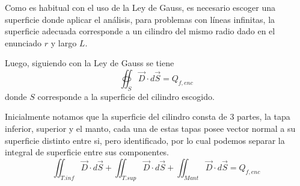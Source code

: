 \documentclass[11pt]{article}
\begin{document}
\begin{solucion}
    Como es habitual con el uso de la Ley de Gauss, es necesario escoger una superficie donde aplicar el análisis, para problemas con líneas infinitas, la superficie adecuada corresponde a un cilindro del mismo radio dado en el enunciado $r$ y largo \textbf{} $L$.

    \begin{figure}[H]
        \centering
    \end{figure}

    Luego, siguiendo con la Ley de Gauss se tiene
    \begin{equation}
        \oiint_S \vec{D} \cdot d\vec{S} = Q_{f, enc}
    \end{equation}
    donde $S$ corresponde a la superficie del cilindro escogido.

    Inicialmente notamos que la superficie del cilindro consta de 3 partes, la tapa inferior, superior y el manto, cada una de estas tapas posee vector normal a su superficie distinto entre si, pero identificado, por lo cual podemos separar la integral de superficie entre sus componentes.
    \begin{equation}
        \iint_{T. inf} \vec{D} \cdot d\vec{S} + \iint_{T. sup} \vec{D} \cdot d\vec{S} + \iint_{Mant} \vec{D} \cdot d\vec{S} = Q_{f, enc}
    \end{equation}


\end{solucion}
\end{document}
